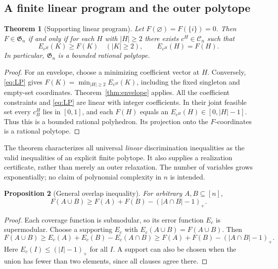 \documentclass[a4paper,11pt,onecolumn,unpublished]{quantumarticle}
\newtheorem{theorem}{Theorem}[section]
\newtheorem{proposition}[theorem]{Proposition}
\theoremstyle{definition}
\newcommand{\1}{\mathbf 1}
\newcommand{\Coeff}{\mathcal C}
\newcommand{\Greg}{\mathfrak G}
\begin{document}
\subsection{A finite linear program and the outer polytope}

\begin{theorem}[Supporting linear program]\label{thm:LP}
Let $F(\varnothing)=F(\{i\})=0$. Then $F\in\Greg_n$ if and only if for each
$H$ with $|H|\ge2$ there exists $c^H\in\Coeff_n$ such that
\begin{equation}\label{eq:LP}
 E_{c^H}(K)\ge F(K)\quad(|K|\ge2),\qquad E_{c^H}(H)=F(H).
\end{equation}
In particular, $\Greg_n$ is a bounded rational polytope.
\end{theorem}
\begin{proof}
For an envelope, choose a minimizing coefficient vector at $H$. Conversely,
\eqref{eq:LP} gives $F(K)=\min_{|H|\ge2}E_{c^H}(K)$, including the fixed
singleton and empty-set coordinates. Theorem~\ref{thm:envelope} applies.
All the coefficient constraints and \eqref{eq:LP} are linear with integer
coefficients. In their joint feasible set every $c_B^H$ lies in $[0,1]$, and
each $F(H)$ equals an $E_{c^H}(H)\in[0,|H|-1]$. Thus this is a bounded rational
polyhedron. Its projection onto the $F$-coordinates is a rational polytope.
\end{proof}

The theorem characterizes all universal \emph{linear} discrimination
inequalities as the valid inequalities of an explicit finite polytope. It also
supplies a realization certificate, rather than merely an outer relaxation.
The number of variables grows exponentially; no claim of polynomial complexity
in $n$ is intended.

\begin{proposition}[General overlap inequality]\label{prop:overlap}
For arbitrary $A,B\subseteq[n]$,
\begin{equation}\label{eq:overlap}
 F(A\cup B)\ge F(A)+F(B)-(|A\cap B|-1)_+.
\end{equation}
\end{proposition}
\begin{proof}
Each coverage function is submodular, so its error function $E_c$ is
supermodular. Choose a supporting $E_c$ with $E_c(A\cup B)=F(A\cup B)$.
Then
\[
 F(A\cup B)\ge E_c(A)+E_c(B)-E_c(A\cap B)
 \ge F(A)+F(B)-(|A\cap B|-1)_+.
\]
Here $E_c(I)\le(|I|-1)_+$ for all $I$. A support can also be chosen when the
union has fewer than two elements, since all clauses agree there.
\end{proof}
\end{document}

